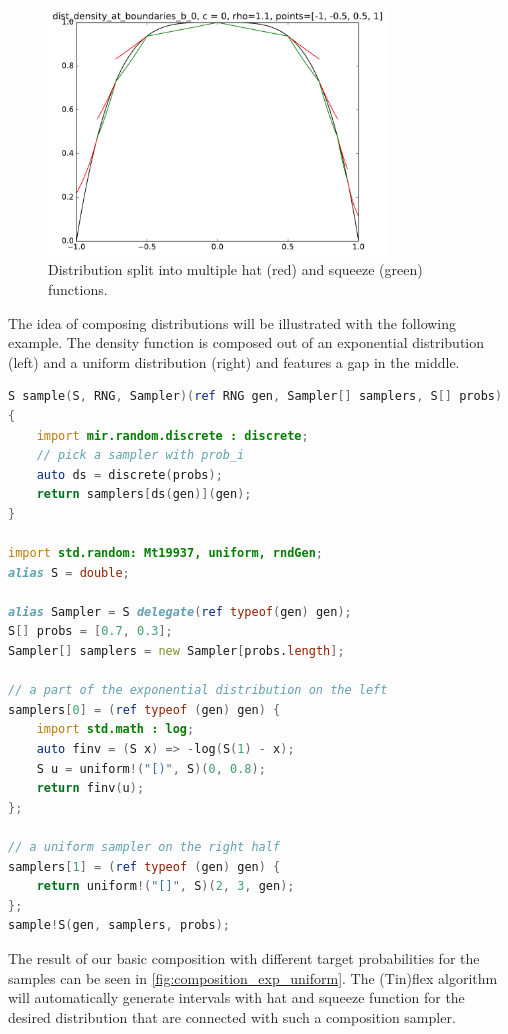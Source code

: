 \begin{figure}[h!]
\centering
\includegraphics[width=0.8\textwidth]{figs/dist_density_at_boundaries_b_0_hs.pdf}
\caption{Distribution split into multiple hat (red) and squeeze (green) functions.}
\label{fig:dist_composition}
\end{figure}

The idea of composing distributions will be illustrated with the following example. The density function is composed out of an exponential distribution (left) and a uniform distribution (right) and features a gap in the middle.

\begin{lstlisting}[language=D]
S sample(S, RNG, Sampler)(ref RNG gen, Sampler[] samplers, S[] probs)
{
    import mir.random.discrete : discrete;
    // pick a sampler with prob_i
    auto ds = discrete(probs);
    return samplers[ds(gen)](gen);
}

import std.random: Mt19937, uniform, rndGen;
alias S = double;

alias Sampler = S delegate(ref typeof(gen) gen);
S[] probs = [0.7, 0.3];
Sampler[] samplers = new Sampler[probs.length];

// a part of the exponential distribution on the left
samplers[0] = (ref typeof (gen) gen) {
    import std.math : log;
    auto finv = (S x) => -log(S(1) - x);
    S u = uniform!("[)", S)(0, 0.8);
    return finv(u);
};

// a uniform sampler on the right half
samplers[1] = (ref typeof (gen) gen) {
    return uniform!("[]", S)(2, 3, gen);
};
sample!S(gen, samplers, probs);
\end{lstlisting}

The result of our basic composition with different target probabilities for the samples can be seen in \autoref{fig:composition_exp_uniform}. The (Tin)flex algorithm will automatically generate intervals with hat and squeeze function for the desired distribution that are connected with such a composition sampler.

